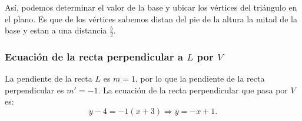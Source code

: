 \documentclass[11pt]{article}
\begin{document}
\begin{enumerate}[\hspace{-5mm} 1) ]
\begin{enumerate}[(a) ]
\begin{minipage}{.53\textwidth}
\end{minipage}\qquad\begin{minipage}{.37\textwidth}

\begin{center}
\end{center}
\end{minipage}



Así, podemos determinar el valor de la base y ubicar los vértices del triángulo en el plano. Es que de los vértices sabemos distan del pie de la altura la mitad de la base y estan a una distancia $\frac{b}{2}$.


\bigskip




\subsubsection*{Ecuación de la recta perpendicular a $L$ por $V$}
La pendiente de la recta $L$ es $m = 1$, por lo que la pendiente de la recta perpendicular es $m'= -1$.
La ecuación de la recta perpendicular que pasa por $V$ es:
\[
y - 4 = -1(x + 3) \Rightarrow y = -x + 1.
\]


\end{enumerate}
\end{enumerate}
\end{document}
